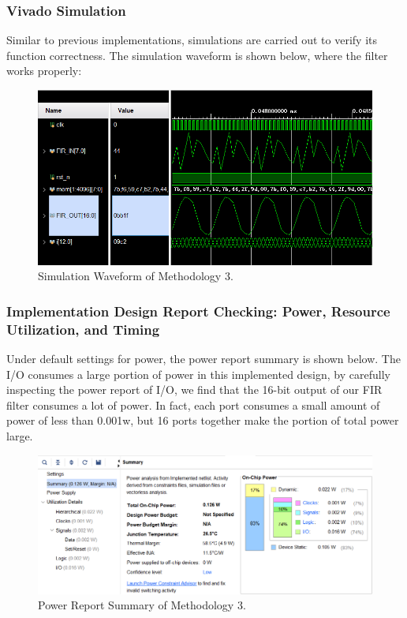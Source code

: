 \documentclass[a4paper]{article}
\begin{document}
\subsubsection{Vivado Simulation}
Similar to previous implementations, simulations are carried out to verify its function correctness. The simulation waveform is shown below, where the filter works properly:
\begin{figure}[H]
    \centering
    \includegraphics[width=1\textwidth]{part4_3_3.png}
    \caption{Simulation Waveform of Methodology 3.}
\end{figure}
\subsubsection{Implementation Design Report Checking: Power, Resource Utilization, and Timing}
Under default settings for power, the power report summary is shown below. The I/O consumes a large portion of power in this implemented design, by carefully inspecting the power report of I/O, we find that the 16-bit output of our FIR filter consumes a lot of power. In fact, each port consumes a small amount of power of less than 0.001w, but 16 ports together make the portion of total power large. 
\begin{figure}[H]
    \centering
    \includegraphics[width=1\textwidth]{part4_3_4_1.png}
    \caption{Power Report Summary of Methodology 3.}
\end{figure}
\end{document}
